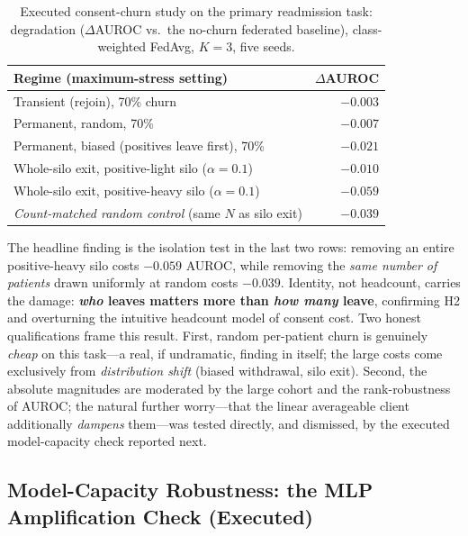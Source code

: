 \documentclass[12pt]{report}
\begin{document}
\begin{table}[htbp]
\centering
\caption{Executed consent-churn study on the primary readmission task:
degradation ($\Delta$AUROC vs.\ the no-churn federated baseline), class-weighted
FedAvg, $K{=}3$, five seeds.}
\label{tab:churn_results}
\begin{tabular}{lr}
\toprule
Regime (maximum-stress setting) & $\Delta$AUROC \\
\midrule
Transient (rejoin), 70\% churn                          & $-0.003$ \\
Permanent, random, 70\%                                 & $-0.007$ \\
Permanent, biased (positives leave first), 70\%         & $-0.021$ \\
Whole-silo exit, positive-light silo ($\alpha{=}0.1$)   & $-0.010$ \\
Whole-silo exit, positive-heavy silo ($\alpha{=}0.1$)   & $-0.059$ \\
\emph{Count-matched random control} (same $N$ as silo exit) & $-0.039$ \\
\bottomrule
\end{tabular}
\end{table}

The headline finding is the isolation test in the last two rows: removing an
entire positive-heavy silo costs $-0.059$ AUROC, while removing the \emph{same
number of patients} drawn uniformly at random costs $-0.039$. Identity, not
headcount, carries the damage: \textbf{\emph{who} leaves matters more than
\emph{how many} leave}, confirming H2 and overturning the intuitive headcount
model of consent cost. Two honest qualifications frame this result. First,
random per-patient churn is genuinely \emph{cheap} on this task---a real, if
undramatic, finding in itself; the large costs come exclusively from
\emph{distribution shift} (biased withdrawal, silo exit). Second, the absolute
magnitudes are moderated by the large cohort and the rank-robustness of AUROC;
the natural further worry---that the linear averageable client additionally
\emph{dampens} them---was tested directly, and dismissed, by the executed
model-capacity check reported next.

\subsection{Model-Capacity Robustness: the MLP Amplification Check (Executed)}
\label{sec:mlp_check}
\end{document}
